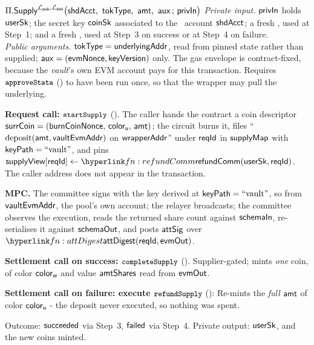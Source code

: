 \begin{ProcBox}{$\Pi.\Supply^{\Lpub, \Lshd}\bigl(\shdAcct\bc \tokType\bc \amt\bc \auxx \,;\,
      \privIn\bigr)$}
\label{box:supply}
\sloppy
\emph{Private input.} $\mathsf{privIn}$ holds $\mathsf{userSk}$; the secret key $\mathsf{coinSk}$ associated to the
\zkswap\ account $\mathsf{shdAcct}$; a fresh \freshrn{$\burnNonce$}, used at Step~1; and a fresh
\freshrn{$\mintNonce$}, used at Step~3 on success or at Step~4 on failure.\\
\emph{Public arguments.} $\mathsf{tokType} = \mathsf{underlyingAddr}$, read from pinned state rather than supplied;
$\mathsf{aux} = (\mathsf{evmNonce}, \mathsf{keyVersion})$ only. The gas envelope is contract-fixed, because the
\emph{vault}'s own EVM account pays for this transaction. Requires $\texttt{\small approveStata}$
() to have been run once, so that the wrapper may pull the underlying.

\begin{Steps}
\item \textbf{Request call: $\texttt{\small startSupply}$} (). The caller hands the contract a
      coin descriptor $\mathsf{surrCoin} = (\mathsf{burnCoinNonce},\, \mathsf{color}_{\mathsf{u}},\, \mathsf{amt})$; the circuit burns it, files
      ``$\text{deposit}(\mathsf{amt}, \mathsf{vaultEvmAddr})$ on $\mathsf{wrapperAddr}$'' under $\mathsf{reqId}$ in $\mathsf{supplyMap}$ with
      $\mathsf{keyPath} = \text{``vault''}$, and pins
      $\supplyMarkerMap[\rid] \gets \lnk{fn:refundComm}{\refundComm(\usersk, \rid)}$. The caller address does not appear in the transaction.
\item \textbf{MPC.} The committee signs with the key derived at $\mathsf{keyPath} = \text{``vault''}$, so from
      $\mathsf{vaultEvmAddr}$, the pool's own account; the relayer broadcasts; the committee observes the
      execution, reads the returned share count against $\mathsf{schemaIn}$, re-serialises it against
      $\mathsf{schemaOut}$, and posts $\mathsf{attSig}$ over
      $\lnk{fn:attDigest}{\attDigest(\rid, \evmOut)}$.
\item \textbf{Settlement call on success: $\texttt{\small completeSupply}$} ().
      Supplier-gated; mints \emph{one} coin, of color $\mathsf{color}_{\mathsf{w}}$ and value $\mathsf{amtShares}$ read from
      $\mathsf{evmOut}$.
\item \textbf{Settlement call on failure:  execute $\texttt{\small refundSupply}$}   ():  Re-mints the \emph{full} $\mathsf{amt}$ of color $\mathsf{color}_{\mathsf{u}}$ - the deposit never executed, so nothing was spent.
\end{Steps}

\medskip
Outcome: $\mathsf{succeeded}$ via Step~3, $\mathsf{failed}$ via Step~4. Private output: $\mathsf{userSk}$, and the new coins minted.
\end{ProcBox}


